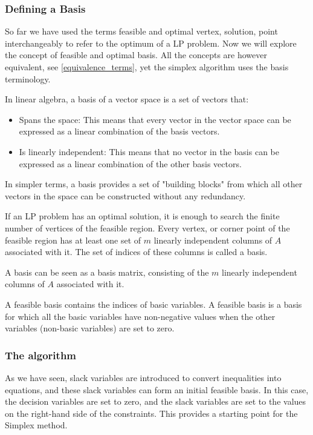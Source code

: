 \subsubsection{Defining a Basis}
So far we have used the terms feasible and optimal vertex, solution,
point interchangeably to refer
to the optimum of a LP problem. Now we will explore the concept of feasible and optimal basis. All the
concepts are however equivalent, see \ref{equivalence_terms}, yet the simplex algorithm uses the
basis terminology.

In  linear algebra, a basis of a vector space is a set of vectors that:
\begin{itemize}
    \item Spans the space: This means that every vector in the vector space
          can be expressed as a linear combination of the basis vectors.
    \item Is linearly independent: This means that no vector in the basis can be
          expressed as a linear combination of the other basis vectors.
\end{itemize}

In simpler terms, a basis provides a set of "building blocks" from which all other vectors in the
space can be constructed without any redundancy.

If an LP problem has an optimal solution, it is enough to search the finite number
of vertices of the feasible region. Every vertex, or corner point of the feasible region has at least
one set of $m$ linearly independent columns of $A$ associated with it. The set of indices
of these columns is called a basis.

A basis can be seen as a basis matrix, consisting of the
$m$ linearly independent columns of $A$ associated with it.

A feasible basis contains the indices of basic
variables. A feasible basis is a basis for which all the basic variables have
non-negative values when the other variables (non-basic variables) are set to zero.


\subsubsection{The algorithm}
As we have seen, slack variables are introduced to convert inequalities
into equations, and these slack variables can form an initial feasible basis.
In this case, the decision variables are set to zero, and the slack variables are set to
the values on the right-hand side of the constraints.
This provides a starting point for the Simplex method.

